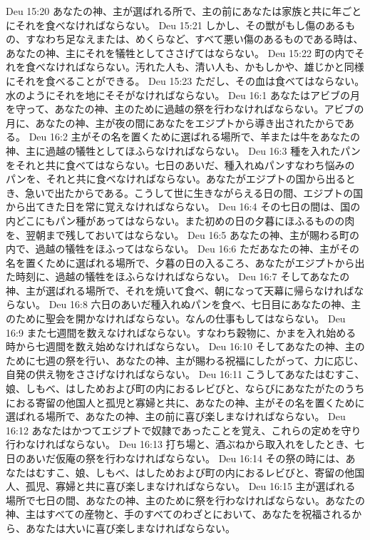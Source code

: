Deu 15:20  あなたの神、主が選ばれる所で、主の前にあなたは家族と共に年ごとにそれを食べなければならない。
Deu 15:21  しかし、その獣がもし傷のあるもの、すなわち足なえまたは、めくらなど、すべて悪い傷のあるものである時は、あなたの神、主にそれを犠牲としてささげてはならない。
Deu 15:22  町の内でそれを食べなければならない。汚れた人も、清い人も、かもしかや、雄じかと同様にそれを食べることができる。
Deu 15:23  ただし、その血は食べてはならない。水のようにそれを地にそそがなければならない。
Deu 16:1  あなたはアビブの月を守って、あなたの神、主のために過越の祭を行わなければならない。アビブの月に、あなたの神、主が夜の間にあなたをエジプトから導き出されたからである。
Deu 16:2  主がその名を置くために選ばれる場所で、羊または牛をあなたの神、主に過越の犠牲としてほふらなければならない。
Deu 16:3  種を入れたパンをそれと共に食べてはならない。七日のあいだ、種入れぬパンすなわち悩みのパンを、それと共に食べなければならない。あなたがエジプトの国から出るとき、急いで出たからである。こうして世に生きながらえる日の間、エジプトの国から出てきた日を常に覚えなければならない。
Deu 16:4  その七日の間は、国の内どこにもパン種があってはならない。また初めの日の夕暮にほふるものの肉を、翌朝まで残しておいてはならない。
Deu 16:5  あなたの神、主が賜わる町の内で、過越の犠牲をほふってはならない。
Deu 16:6  ただあなたの神、主がその名を置くために選ばれる場所で、夕暮の日の入るころ、あなたがエジプトから出た時刻に、過越の犠牲をほふらなければならない。
Deu 16:7  そしてあなたの神、主が選ばれる場所で、それを焼いて食べ、朝になって天幕に帰らなければならない。
Deu 16:8  六日のあいだ種入れぬパンを食べ、七日目にあなたの神、主のために聖会を開かなければならない。なんの仕事もしてはならない。
Deu 16:9  また七週間を数えなければならない。すなわち穀物に、かまを入れ始める時から七週間を数え始めなければならない。
Deu 16:10  そしてあなたの神、主のために七週の祭を行い、あなたの神、主が賜わる祝福にしたがって、力に応じ、自発の供え物をささげなければならない。
Deu 16:11  こうしてあなたはむすこ、娘、しもべ、はしためおよび町の内におるレビびと、ならびにあなたがたのうちにおる寄留の他国人と孤児と寡婦と共に、あなたの神、主がその名を置くために選ばれる場所で、あなたの神、主の前に喜び楽しまなければならない。
Deu 16:12  あなたはかつてエジプトで奴隷であったことを覚え、これらの定めを守り行わなければならない。
Deu 16:13  打ち場と、酒ぶねから取入れをしたとき、七日のあいだ仮庵の祭を行わなければならない。
Deu 16:14  その祭の時には、あなたはむすこ、娘、しもべ、はしためおよび町の内におるレビびと、寄留の他国人、孤児、寡婦と共に喜び楽しまなければならない。
Deu 16:15  主が選ばれる場所で七日の間、あなたの神、主のために祭を行わなければならない。あなたの神、主はすべての産物と、手のすべてのわざとにおいて、あなたを祝福されるから、あなたは大いに喜び楽しまなければならない。
